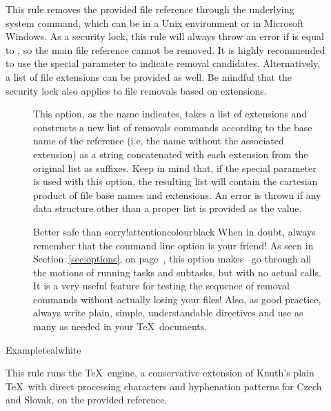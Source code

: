 \begin{description}
\item[]
This rule removes the provided file reference through the underlying system command, which can be  in a Unix environment or  in Microsoft Windows. As a security lock, this rule will always throw an error if  is equal to , so the main file reference cannot be removed. It is highly recommended to use the special  parameter to indicate removal candidates. Alternatively, a list of file extensions can be provided as well. Be mindful that the security lock also applies to file removals based on extensions.

\begin{description}
\item[] This option, as the name indicates, takes a list of extensions and constructs a new list of removals commands according to the base name of the  reference (i.e, the name without the associated extension) as a string concatenated with each extension from the original list as suffixes. Keep in mind that, if the special  parameter is used with this option, the resulting list will contain the cartesian product of file base names and extensions. An error is thrown if any data structure other than a proper list is provided as the value.

\begin{messagebox}{Better safe than sorry!}{attentioncolour}{\icattention}{black}
When in doubt, always remember that the  command line option is your friend! As seen in Section~\ref{sec:options}, on page~\pageref{sec:options}, this option makes \arara\ go through all the motions of running tasks and subtasks, but with no actual calls. It is a very useful feature for testing the sequence of removal commands without actually losing your files! Also, as good practice, always write plain, simple, understandable  directives and use as many as needed in your \TeX\ documents.
\end{messagebox}
\end{description}

\begin{codebox}{Example}{teal}{\icnote}{white}
\end{codebox}

\item[]
This rule runs the  \TeX\ engine, a conservative extension of Knuth's plain \TeX\ with direct processing characters and hyphenation patterns for Czech and Slovak, on the provided  reference.


\end{description}
